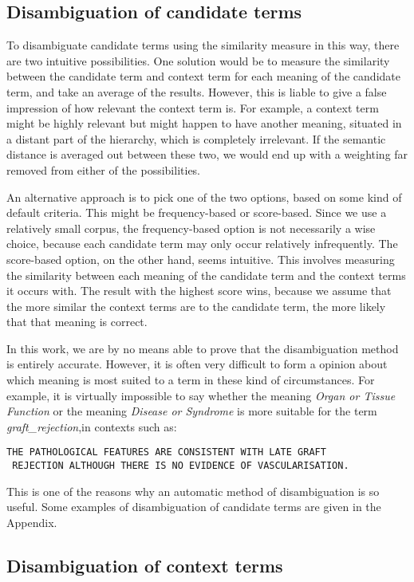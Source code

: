 \subsection{Disambiguation of candidate terms}
To disambiguate candidate terms using the similarity measure in this way, there are two intuitive possibilities. One
solution would be to measure the similarity between the candidate term
and context term for each meaning of the candidate term, and take an average of the results. However, this is liable to give a false
impression of how relevant the context term is. For example, a context
term might be highly relevant but might happen to have another
meaning, situated in a distant part of the hierarchy, which is completely
irrelevant. If the semantic distance is averaged out between these
two, we would end up with a weighting far removed from either of the
possibilities.

An alternative approach is to pick one of the two options, based on
some kind of default criteria. This might be frequency-based or
score-based. Since we use a relatively small corpus, the
frequency-based option is not necessarily a wise choice, because each
candidate term may only occur relatively infrequently. The
score-based option, on the other hand, seems intuitive. This involves
measuring the similarity between each meaning of the candidate term
and the context terms it occurs with. The result with the highest score wins,
because we assume that the more similar the context terms are to the
candidate term, the more likely that that meaning is correct.

In this work, we are by no means able to prove that the disambiguation
method is entirely accurate. However,
it is often very difficult to form a opinion about which meaning is
most suited to a term in these kind of circumstances. For example, it
is virtually impossible to say whether the meaning {\it Organ or
Tissue Function} or the meaning {\it Disease or Syndrome} is more
suitable for the term {\it graft\_rejection},in contexts such as:
\begin{verbatim}
THE PATHOLOGICAL FEATURES ARE CONSISTENT WITH LATE GRAFT
 REJECTION ALTHOUGH THERE IS NO EVIDENCE OF VASCULARISATION.
\end{verbatim}
This is one of the reasons why an automatic method of disambiguation
is so useful. Some examples of disambiguation of candidate terms are given in the
Appendix.

\subsection{Disambiguation of context terms}

